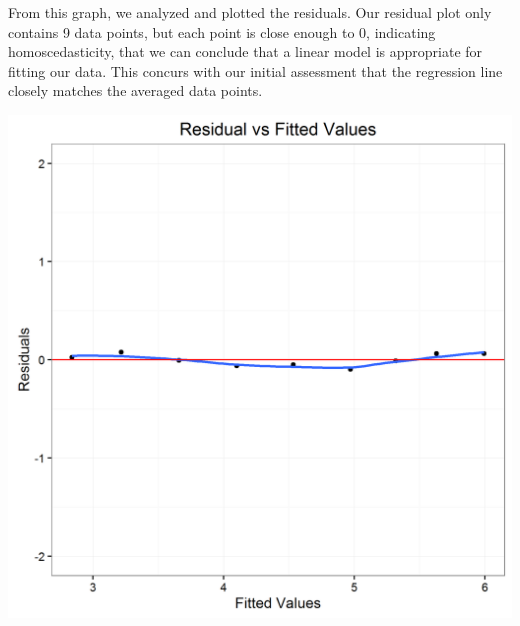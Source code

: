\documentclass[11pt]{article} %
\begin{document}
From this graph, we analyzed and plotted the residuals. Our residual plot only contains 9 data points, but each point is close enough to 0, indicating homoscedasticity, that we can conclude that a linear model is appropriate for fitting our data. This concurs with our initial assessment that the regression line closely matches the averaged data points.
\begin{center}\includegraphics[scale=0.5]{residualsPlot.png}\end{center}
\end{document}
